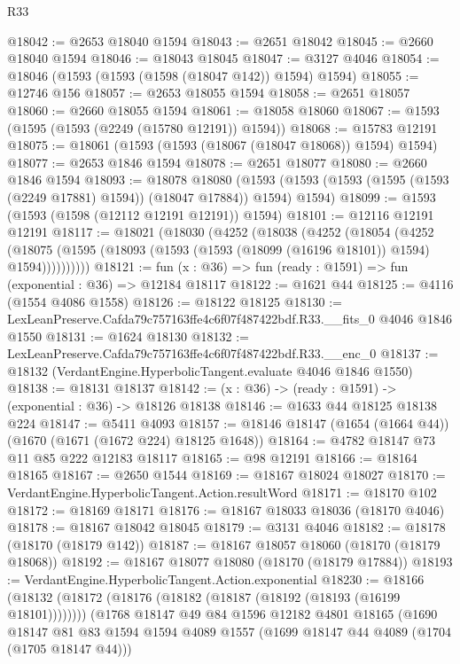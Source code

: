 \begin{lexlean}{R33}
\begin{coremodule}
@18042 := @2653 @18040 @1594
@18043 := @2651 @18042
@18045 := @2660 @18040 @1594
@18046 := @18043 @18045
@18047 := @3127 @4046
@18054 := @18046 (@1593 (@1593 (@1598 (@18047 @142)) @1594) @1594)
@18055 := @12746 @156
@18057 := @2653 @18055 @1594
@18058 := @2651 @18057
@18060 := @2660 @18055 @1594
@18061 := @18058 @18060
@18067 := @1593 (@1595 (@1593 (@2249 (@15780 @12191)) @1594))
@18068 := @15783 @12191
@18075 := @18061 (@1593 (@1593 (@18067 (@18047 @18068)) @1594) @1594)
@18077 := @2653 @1846 @1594
@18078 := @2651 @18077
@18080 := @2660 @1846 @1594
@18093 := @18078
    @18080
    (@1593 (@1593 (@1593 (@1595 (@1593 (@2249 @17881) @1594)) (@18047 @17884)) @1594) @1594)
@18099 := @1593 (@1593 (@1598 (@12112 @12191 @12191)) @1594)
@18101 := @12116 @12191 @12191
@18117 := @18021
    (@18030
      (@4252
        (@18038
          (@4252
            (@18054
              (@4252
                (@18075 (@1595 (@18093 (@1593 (@1593 (@18099 (@16196 @18101)) @1594) @1594))))))))))
@18121 := fun (x : @36) => fun (ready : @1591) => fun (exponential : @36) => @12184 @18117
@18122 := @1621 @44
@18125 := @4116 (@1554 @4086 @1558)
@18126 := @18122 @18125
@18130 := LexLeanPreserve.Cafda79c757163ffe4c6f07f487422bdf.R33.__fits_0 @4046 @1846 @1550
@18131 := @1624 @18130
@18132 := LexLeanPreserve.Cafda79c757163ffe4c6f07f487422bdf.R33.__enc_0
@18137 := @18132 (VerdantEngine.HyperbolicTangent.evaluate @4046 @1846 @1550)
@18138 := @18131 @18137
@18142 := (x : @36) -> (ready : @1591) -> (exponential : @36) -> @18126 @18138
@18146 := @1633 @44 @18125 @18138 @224
@18147 := @5411 @4093
@18157 := @18146 @18147 (@1654 (@1664 @44)) (@1670 (@1671 (@1672 @224) @18125 @1648))
@18164 := @4782 @18147 @73 @11 @85 @222 @12183 @18117
@18165 := @98 @12191
@18166 := @18164 @18165
@18167 := @2650 @1544
@18169 := @18167 @18024 @18027
@18170 := VerdantEngine.HyperbolicTangent.Action.resultWord
@18171 := @18170 @102
@18172 := @18169 @18171
@18176 := @18167 @18033 @18036 (@18170 @4046)
@18178 := @18167 @18042 @18045
@18179 := @3131 @4046
@18182 := @18178 (@18170 (@18179 @142))
@18187 := @18167 @18057 @18060 (@18170 (@18179 @18068))
@18192 := @18167 @18077 @18080 (@18170 (@18179 @17884))
@18193 := VerdantEngine.HyperbolicTangent.Action.exponential
@18230 := @18166
    (@18132 (@18172 (@18176 (@18182 (@18187 (@18192 (@18193 (@16199 @18101))))))))
    (@1768
      @18147
      @49
      @84
      @1596
      @12182
      @4801
      @18165
      (@1690
        @18147
        @81
        @83
        @1594
        @1594
        @4089
        @1557
        (@1699 @18147 @44 @4089 (@1704 (@1705 @18147 @44)))

\end{coremodule}
\end{lexlean}

